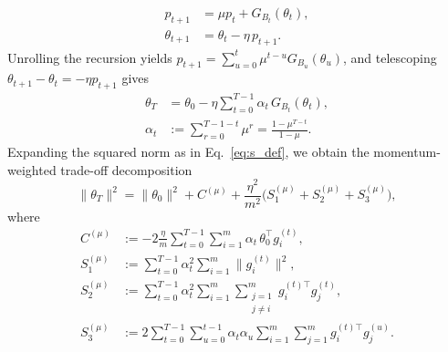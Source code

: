 \begin{equation}
\label{eq:momentum_updates}
\begin{aligned}
  p_{t+1} &= \mu p_t + G_{B_t}(\theta_t),\\
  \theta_{t+1} &= \theta_t - \eta\, p_{t+1}.
\end{aligned}
\end{equation}
Unrolling the recursion yields $p_{t+1}=\sum_{u=0}^{t}\mu^{t-u}G_{B_u}(\theta_u)$, and telescoping $\theta_{t+1}-\theta_t=-\eta p_{t+1}$ gives
\begin{equation}
\begin{aligned}
\label{eq:thetaT_momentum}
\theta_T
&=\theta_0-\eta\sum_{t=0}^{T-1}\alpha_t\,G_{B_t}(\theta_t),
\\
\alpha_t
&:=\sum_{r=0}^{T-1-t}\mu^r
=
\frac{1-\mu^{T-t}}{1-\mu}.
\end{aligned}
\end{equation}
%
Expanding the squared norm as in Eq.~\eqref{eq:s_def}, we obtain the momentum-weighted trade-off decomposition
\begin{equation}
\label{eq:thetaT_full_momentum}
\|\theta_T\|^{2}
=\|\theta_0\|^{2}
+ C^{(\mu)}
+\frac{\eta^{2}}{m^{2}}\bigl(S_1^{(\mu)}+S_2^{(\mu)}+S_3^{(\mu)}\bigr),
\end{equation}
where
\begin{align}
C^{(\mu)}
&:=
-2\frac{\eta}{m}\sum_{t=0}^{T-1}\sum_{i=1}^{m}\alpha_t\,\theta_0^{\top}g_i^{(t)},
\label{eq:C_mu}\\
S_1^{(\mu)}
&:=
\sum_{t=0}^{T-1}\alpha_t^2\sum_{i=1}^{m}\|g_i^{(t)}\|^2,
\label{eq:S1_mu}\\
S_2^{(\mu)}
&:=
\sum_{t=0}^{T-1}\alpha_t^2\sum_{i=1}^{m}\sum_{\substack{j=1\\ j\neq i}}^{m} g_i^{(t)\top}g_j^{(t)},
\label{eq:S2_mu}\\
S_3^{(\mu)}
&:=
2\sum_{t=0}^{T-1}\sum_{u=0}^{t-1}\alpha_t\alpha_u\sum_{i=1}^{m}\sum_{j=1}^{m} g_i^{(t)\top}g_j^{(u)}.
\label{eq:S3_mu}
\end{align}
%
